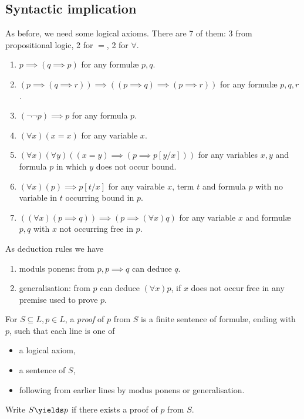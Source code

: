 \documentclass[a4paper]{article}
\begin{document}
\subsection{Syntactic implication}

As before, we need some logical axioms. There are 7 of them: 3 from propositional logic, 2 for \(=\), 2 for \(\forall\).

\begin{enumerate}
\item \(p \implies (q \implies p)\) for any formulæ \(p, q\).
\item \((p \implies (q \implies r)) \implies ((p \implies q) \implies (p \implies r))\) for any formulæ \(p, q, r\).
\item \((\neg\neg p) \implies p\) for any formula \(p\).
\item \((\forall x) (x = x)\) for any variable \(x\).
\item \((\forall x) (\forall y) ((x = y) \implies (p \implies p[y/x]))\) for any variables \(x, y\) and formula \(p\) in which \(y\) does not occur bound.
\item \((\forall x) (p) \implies p[t/x]\) for any vairable \(x\), term \(t\) and formula \(p\) with no variable in \(t\) occurring bound in \(p\).
\item \(((\forall x) (p \implies q)) \implies (p \implies (\forall x) q)\) for any variable \(x\) and formulæ \(p, q\) with \(x\) not occurring free in \(p\).
\end{enumerate}

As deduction rules we have
\begin{enumerate}
\item moduls ponens: from \(p, p \implies q\) can deduce \(q\).
\item generalisation: from \(p\) can deduce \((\forall x) p\), if \(x\) does not occur free in any premise used to prove \(p\).
\end{enumerate}

\begin{definition}[Proof]
  For \(S \subseteq L, p \in L\), a \emph{proof} of \(p\) from \(S\) is a finite sentence of formulæ, ending with \(p\), such that each line is one of
  \begin{itemize}
  \item a logical axiom,
  \item a sentence of \(S\),
  \item following from earlier lines by modus ponens or generalisation.
  \end{itemize}
  Write \(S \yields p\) if there exists a proof of \(p\) from \(S\).
\end{definition}
\end{document}
